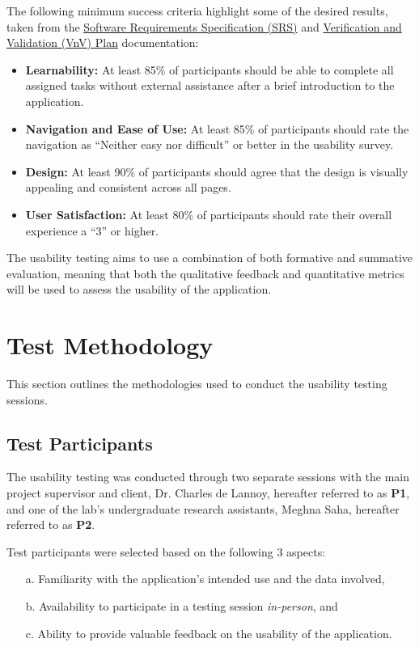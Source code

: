 \documentclass{article}
\begin{document}
The following minimum success criteria highlight some of the desired results, taken
from the
\href{https://github.com/SumanyaG/Alkalytics/blob/main/docs/SRS/SRS.pdf}{Software
Requirements Specification (SRS)} and
\href{https://github.com/SumanyaG/Alkalytics/blob/main/docs/VnVPlan/VnVPlan.pdf}{Verification
and Validation (VnV) Plan} documentation:
\begin{itemize}
    \item \textbf{Learnability:} At least 85\% of participants should be able to
    complete all assigned tasks without external assistance after a brief
    introduction to the application.
    \item \textbf{Navigation and Ease of Use:} At least 85\% of participants
    should rate the navigation as ``Neither easy nor difficult'' or better in
    the usability survey.
    \item \textbf{Design:} At least 90\% of participants should agree that the
    design is visually appealing and consistent across all pages.
    \item \textbf{User Satisfaction:} At least 80\% of participants should rate
    their overall experience a ``3'' or higher.
\end{itemize}

The usability testing aims to use a combination of both formative and
summative evaluation, meaning that both the qualitative feedback and
quantitative metrics will be used to assess the usability of the application.

\section{Test Methodology}
This section outlines the methodologies used to conduct the usability testing
sessions. 

\subsection{Test Participants}
The usability testing was conducted through two separate sessions with the
main project supervisor and client, Dr. Charles de Lannoy, hereafter referred
to as \textbf{P1}, and one of the lab's undergraduate research assistants, Meghna Saha,
hereafter referred to as \textbf{P2}.

Test participants were selected based on the following 3 aspects:
\begin{itemize}
    \item[a.] Familiarity with the application's intended use and the data involved,
    \item[b.] Availability to participate in a testing session \emph{in-person}, and
    \item[c.] Ability to provide valuable feedback on the usability of the
    application.
\end{itemize}
\end{document}
